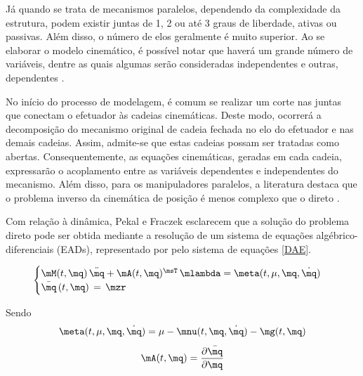 \documentclass[]{politex}
\begin{document}

Já quando se trata de mecanismos paralelos, dependendo da complexidade da estrutura, podem existir juntas de 1, 2 ou até 3 graus de liberdade, ativas ou passivas. Além disso, o número de elos geralmente é muito superior. Ao se elaborar o modelo cinemático, é possível notar que haverá um grande número de variáveis, dentre as quais algumas serão consideradas independentes e outras, dependentes \cite{Merlet}.

No início do processo de modelagem, é comum  se realizar um corte nas juntas que conectam o efetuador às cadeias cinemáticas. Deste modo, ocorrerá a decomposição do mecanismo original de cadeia fechada no elo do efetuador e nas demais cadeias. Assim, admite-se que estas cadeias possam ser tratadas como abertas. Consequentemente, as equações cinemáticas, geradas em cada cadeia, expressarão o acoplamento entre as variáveis dependentes e independentes do mecanismo. Além disso, para os manipuladores paralelos, a literatura destaca que o problema inverso da cinemática de posição é menos complexo que o direto \cite{Merlet}. 


Com relação à dinâmica, Pekal e Fraczek \cite{Pekal2} esclarecem que a solução do problema direto pode ser obtida mediante a resolução de um sistema de equações algébrico-diferenciais (EADs), representado por pelo sistema de equações \eqref{DAE}.

\begin{equation} \label{DAE}
\begin{cases}
\mM(t,\mq) \, \ddot{\mq} + \mA(t,\mq)^\msT \,\mlambda = \meta(t,\mu,\mq, \dot{\mq}) \\
\bar{\mq} \, (t,\mq) \, = \, \mzr
\end{cases}
\end{equation}

Sendo
\begin{equation}
\meta(t,\mu,\mq, \dot{\mq}) = \mu - \mnu(t,\mq,\dot{\mq}) - \mg(t,\mq)
\end{equation}
\begin{equation}
\mA(t,\mq) = \frac{\partial \bar{\mq}}{\partial \mq}
\end{equation}
\end{document}
